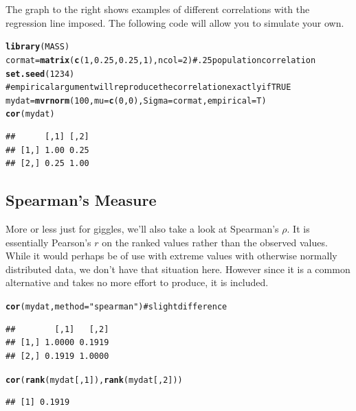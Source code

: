 \documentclass[english,nohyper,titlepage]{tufte-handout}\usepackage{graphicx, color}
\makeatletter
\newcommand{\hlfunctioncall}[1]{\textcolor[rgb]{0.501960784313725,0,0.329411764705882}{\textbf{#1}}}%
\newcommand{\hlstring}[1]{\textcolor[rgb]{0.6,0.6,1}{#1}}%
\newcommand{\hlcomment}[1]{\textcolor[rgb]{0.180392156862745,0.6,0.341176470588235}{#1}}%
\newenvironment{kframe}{%
 \def\at@end@of@kframe{}%
 \ifinner\ifhmode%
  \def\at@end@of@kframe{\end{minipage}}%
  \begin{minipage}{\columnwidth}%
 \fi\fi%
 \def\FrameCommand##1{\hskip\@totalleftmargin \hskip-\fboxsep
 \colorbox{shadecolor}{##1}\hskip-\fboxsep
     \hskip-\linewidth \hskip-\@totalleftmargin \hskip\columnwidth}%
 \MakeFramed {\advance\hsize-\width
   \@totalleftmargin\z@ \linewidth\hsize
   \@setminipage}}%
 {\par\unskip\endMakeFramed%
 \at@end@of@kframe}
\newenvironment{knitrout}{}{} %
\makeatother
\begin{document}
The graph to the right shows examples of different correlations with the regression line imposed.  The following code will allow you to simulate your own.

\begin{knitrout}\footnotesize
{}\color{fgcolor}\begin{kframe}
\begin{alltt}
\hlfunctioncall{library}(MASS)
cormat = \hlfunctioncall{matrix}(\hlfunctioncall{c}(1, 0.25, 0.25, 1), ncol = 2)  \hlcomment{#.25 population correlation}
\hlfunctioncall{set.seed}(1234)
\hlcomment{# empirical argument will reproduce the correlation exactly if TRUE}
mydat = \hlfunctioncall{mvrnorm}(100, mu = \hlfunctioncall{c}(0, 0), Sigma = cormat, empirical = T)
\hlfunctioncall{cor}(mydat)
\end{alltt}
\begin{verbatim}
##      [,1] [,2]
## [1,] 1.00 0.25
## [2,] 0.25 1.00
\end{verbatim}
\end{kframe}
\end{knitrout}


\subsection{Spearman's Measure}
More or less just for giggles, we'll also take a look at Spearman's $\rho$.  It is essentially Pearson's $r$ on the ranked values rather than the observed values.  While it would perhaps be of use with extreme values with otherwise normally distributed data, we don't have that situation here.  However since it is a common alternative and takes no more effort to produce, it is included.


\begin{knitrout}\footnotesize
{}\color{fgcolor}\begin{kframe}
\begin{alltt}
\hlfunctioncall{cor}(mydat, method = \hlstring{"spearman"})  #slight difference
\end{alltt}
\begin{verbatim}
##        [,1]   [,2]
## [1,] 1.0000 0.1919
## [2,] 0.1919 1.0000
\end{verbatim}
\begin{alltt}
\hlfunctioncall{cor}(\hlfunctioncall{rank}(mydat[, 1]), \hlfunctioncall{rank}(mydat[, 2]))
\end{alltt}
\begin{verbatim}
## [1] 0.1919
\end{verbatim}
\end{kframe}
\end{knitrout}
\end{document}
